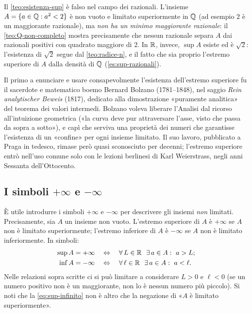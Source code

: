 \begin{attenzione}
Il \cref{teo:esistenza-sup} è falso nel campo dei razionali. L'insieme
$A=\{a\in\mathbb{Q} : a^{2}<2\}$ è non vuoto e limitato superiormente in $\mathbb{Q}$ (ad esempio $2$ è un
maggiorante razionale), ma \emph{non ha un minimo maggiorante razionale}: il
\cref{teo:Q-non-completo} mostra precisamente che nessun razionale separa $A$ dai
razionali positivi con quadrato maggiore di $2$. In $\mathbb{R}$, invece, $\sup A$ esiste ed è
$\sqrt2$: l'esistenza di $\sqrt2$ segue dal \cref{teo:radice-n}, e il fatto che sia
proprio l'estremo superiore di $A$ dalla densità di $\mathbb{Q}$ (\cref{es:sup-razionali}).
\end{attenzione}

\begin{notastorica}
Il primo a enunciare e usare consapevolmente l'esistenza dell'estremo superiore fu il
sacerdote e matematico boemo Bernard Bolzano (1781--1848), nel saggio \emph{Rein
analytischer Beweis} (1817), dedicato alla dimostrazione «puramente analitica» del
teorema dei valori intermedi. Bolzano voleva liberare l'Analisi dal ricorso
all'intuizione geometrica («la curva deve pur attraversare l'asse, visto che passa da
sopra a sotto»), e capì che serviva una proprietà dei numeri che garantisse l'esistenza
di un «confine» per ogni insieme limitato. Il suo lavoro, pubblicato a Praga in tedesco,
rimase però quasi sconosciuto per decenni; l'estremo superiore entrò nell'uso comune solo
con le lezioni berlinesi di Karl Weierstrass, negli anni Sessanta dell'Ottocento.
\end{notastorica}

\subsection{I simboli \texorpdfstring{$+\infty$}{+∞} e \texorpdfstring{$-\infty$}{−∞}}

È utile introdurre i simboli $+\infty$ e $-\infty$ per descrivere gli insiemi
\emph{non} limitati. Precisamente, sia $A$ un insieme non vuoto. L'estremo superiore di
$A$ è $+\infty$ se $A$ non è limitato superiormente; l'estremo inferiore di $A$ è
$-\infty$ se $A$ non è limitato inferiormente. In simboli:
\begin{align}
  \sup A=+\infty \quad&\Leftrightarrow\quad \forall\, L\in\mathbb{R}\ \ \exists\, a\in A : \ a>L; \label{eq:sup-infinito}\\
  \inf A=-\infty \quad&\Leftrightarrow\quad \forall\, \ell\in\mathbb{R}\ \ \exists\, a\in A : \ a<\ell. \label{eq:inf-infinito}
\end{align}
Nelle relazioni sopra scritte ci si può limitare a considerare $L>0$ e $\ell<0$ (se un
numero positivo non è un maggiorante, non lo è nessun numero più piccolo). Si noti che
la \eqref{eq:sup-infinito} non è altro che la negazione di «$A$ è limitato
superiormente».

